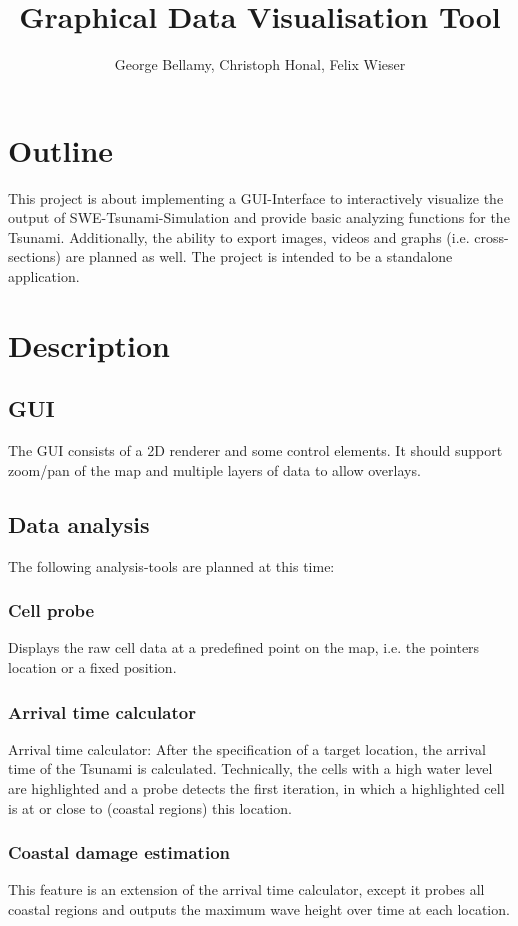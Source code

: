 \documentclass[paper=a4]{proc}
\title{Graphical Data Visualisation Tool}
\author{George Bellamy, Christoph Honal, Felix Wieser}
\begin{document}
	\maketitle
	\thispagestyle{plain}	%
	\section{Outline}
		This project is about implementing a GUI-Interface to interactively visualize the output of SWE-Tsunami-Simulation and provide basic analyzing functions for the Tsunami. Additionally, the ability to export images, videos and graphs (i.e. cross-sections) are planned as well. The project is intended to be a standalone application.
	\section{Description}
		\subsection{GUI}
			The GUI consists of a 2D renderer and some control elements. It should support zoom/pan of the map and multiple layers of data to allow overlays.
 		\subsection{Data analysis}
			The following analysis-tools are planned at this time:
			\subsubsection*{Cell probe}
				Displays the raw cell data at a predefined point on the map, i.e. the pointers location or a fixed position.
			\subsubsection*{Arrival time calculator}
				Arrival time calculator: After the specification of a target location, the arrival time of the Tsunami is calculated. Technically, the cells with a high water level are highlighted and a probe detects the first iteration, in which a highlighted cell is at or close to (coastal regions) this location.
			\subsubsection*{Coastal damage estimation}
				This feature is an extension of the arrival time calculator, except it probes all coastal regions and outputs the maximum wave height over time at each location.
\end{document}
